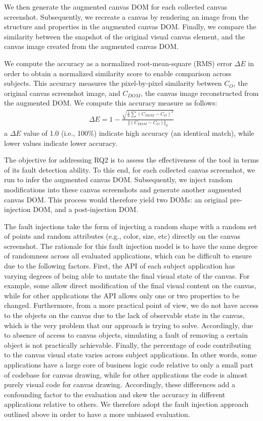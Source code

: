 We then generate the augmented canvas DOM for each collected canvas screenshot. Subsequently, we recreate a canvas by rendering an image from the structure and properties in the augmented canvas DOM. Finally, we compare the similarity between the snapshot of the original visual canvas element, and the canvas image created from the augmented canvas DOM.

We compute the accuracy as a normalized root-mean-square (RMS) error $\Delta E$ in order to obtain a normalized similarity score to enable comparison across subjects. This accuracy measures the pixel-by-pixel similarity between $C_O$, the original canvas screenshot image, and $C_{DOM}$, the canvas image reconstructed from the augmented DOM. We compute this accuracy measure as follows:
\begin{align}
\label{eqn:eval-RQ1}
\Delta E = 1 - \frac{\sqrt{ \frac{1}{n} \sum {\left( C_{DOM} - C_O \right)}^2 }}{\Vert \left( C_{DOM} - C_O \right) \Vert_2}
\end{align}
a $\Delta E$ value of 1.0 (i.e., 100\%) indicate high accuracy (an identical match), while lower values indicate lower accuracy. 

The objective for addressing RQ2 is to assess the effectiveness of the tool in terms of its fault detection ability. To this end, for each collected canvas screenshot, we run \tool to infer the augmented canvas DOM. Subsequently, we inject random modifications into these canvas screenshots and generate another augmented canvas DOM. This process would therefore yield two DOMs: an original pre-injection DOM, and a post-injection DOM.

The fault injections take the form of injecting a random shape with a random set of points and random attributes (e.g., color, size, etc) directly on the canvas screenshot. The rationale for this fault injection model is to have the same degree of randomness across all evaluated applications, which can be difficult to ensure due to the following factors. First, the API of each subject application has varying degrees of being able to mutate the final visual state of the canvas. For example, some allow direct modification of the final visual content on the canvas, while for other applications the API allows only one or two properties to be changed. Furthermore, 
from a more practical point of view, we do not have access to the objects on the canvas due to the lack of observable state in the canvas, which is the very problem that our approach is trying to solve. Accordingly, due to absence of access to canvas objects, simulating a fault of removing a certain object is not practically achievable. Finally, the percentage of code contributing to the canvas visual state varies across subject applications. In other words, some applications have a large core of business logic code relative to only a small part of codebase for canvas drawing, while for other applications the code is almost purely visual code for canvas drawing. Accordingly, these differences add a confounding factor to the evaluation and skew the accuracy in different applications relative to others. We therefore adopt the fault injection approach outlined above in order to have a more unbiased evaluation.  

